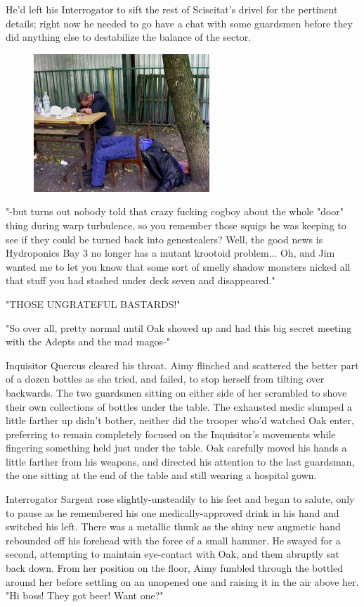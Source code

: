 He'd left his Interrogator to sift the rest of Sciscitat's drivel for the pertinent details; 
right now he needed to go have a chat with some guardsmen before they did anything else to destabilize the balance of the sector.


\begin{figure}
	\begin{center}
		\includegraphics[width=\figwidth]{pics/20/17.png}
	\end{center}
\end{figure}

"-but turns out nobody told that crazy fucking cogboy about the whole "door" thing during warp turbulence, so you remember those squigs he was keeping to see if they could be turned back into genestealers? 
Well, the good news is Hydroponics Bay 3 no longer has a mutant krootoid problem... 
Oh, and Jim wanted me to let you know that some sort of smelly shadow monsters nicked all that stuff you had stashed under deck seven and disappeared."

"THOSE UNGRATEFUL BASTARDS!"

"So over all, pretty normal until Oak showed up and had this big secret meeting with the Adepts and the mad magos-"

Inquisitor Quercus cleared his throat. 
Aimy flinched and scattered the better part of a dozen bottles as she tried, and failed, to stop herself from tilting over backwards. 
The two guardsmen sitting on either side of her scrambled to shove their own collections of bottles under the table. 
The exhausted medic slumped a little farther up didn't bother, neither did the trooper who'd watched Oak enter, preferring to remain completely focused on the Inquisitor's movements while fingering something held just under the table. 
Oak carefully moved his hands a little farther from his weapons, and directed his attention to the last guardsman, the one sitting at the end of the table and still wearing a hospital gown. 


Interrogator Sargent rose slightly-unsteadily to his feet and began to salute, only to pause as he remembered his one medically-approved drink in his hand and switched his left. 
There was a metallic thunk as the shiny new augmetic hand rebounded off his forehead with the force of a small hammer. 
He swayed for a second, attempting to maintain eye-contact with Oak, and them abruptly sat back down. 
From her position on the floor, Aimy fumbled through the bottled around her before settling on an unopened one and raising it in the air above her. 
"Hi boss! 
They got beer! 
Want one?"

